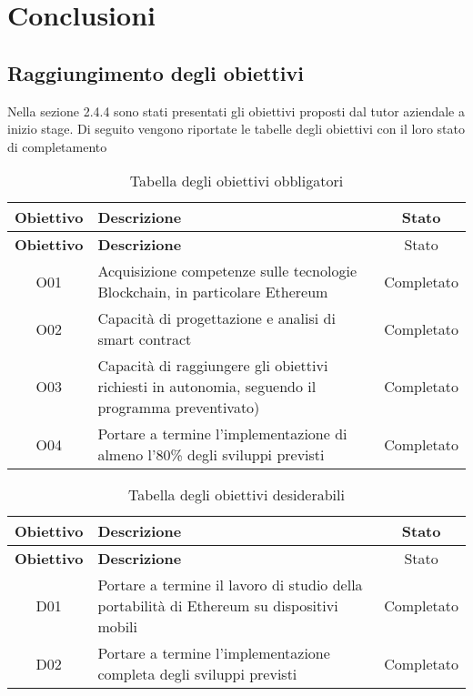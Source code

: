 
\chapter{Conclusioni}
\label{cap:conclusioni}

\section{Raggiungimento degli obiettivi}
Nella sezione 2.4.4 sono stati presentati gli obiettivi proposti dal tutor aziendale a inizio stage.
Di seguito vengono riportate le tabelle degli obiettivi con il loro stato di completamento
\renewcommand{\arraystretch}{3}
\begin{center}
	\begin{longtable}{| c | p{23em} | c | }
		\caption{Tabella degli obiettivi obbligatori}
		\label{tab:obiettivi-obbligatori}\\
		\hline
		\textbf{Obiettivo} & \centering\textbf{Descrizione} & Stato\\
		\endfirsthead
		\hline
		\textbf{Obiettivo} & \centering\textbf{Descrizione} & Stato\\
		\endhead
		\endfoot
		
		\hline
		O01    & Acquisizione competenze sulle tecnologie Blockchain, in particolare Ethereum  & Completato\\
		\hline
		O02    & Capacità di progettazione e analisi di smart contract & Completato\\
		\hline
		O03    & Capacità di raggiungere gli obiettivi richiesti in autonomia, seguendo il programma preventivato) & Completato\\
		\hline
		O04    & Portare a termine l'implementazione di almeno l'80\% degli sviluppi previsti & Completato\\
		\hline
	\end{longtable}
\end{center}

\begin{center}
	\begin{longtable}{| c | p{23em} | c |}
		\caption{Tabella degli obiettivi desiderabili}
		\label{tab:obiettivi-desiderabili}\\
		\hline
		\textbf{Obiettivo} & \centering\textbf{Descrizione} & Stato\\
		\endfirsthead
		\hline
		\textbf{Obiettivo} & \centering\textbf{Descrizione} & Stato\\
		\endhead
		\endfoot
		
		\hline
		D01    & Portare a termine il lavoro di studio della portabilità di Ethereum su dispositivi mobili & Completato\\
		\hline
		D02    & Portare a termine l’implementazione completa degli sviluppi previsti & Completato\\
		\hline
	\end{longtable}
\end{center}
	
